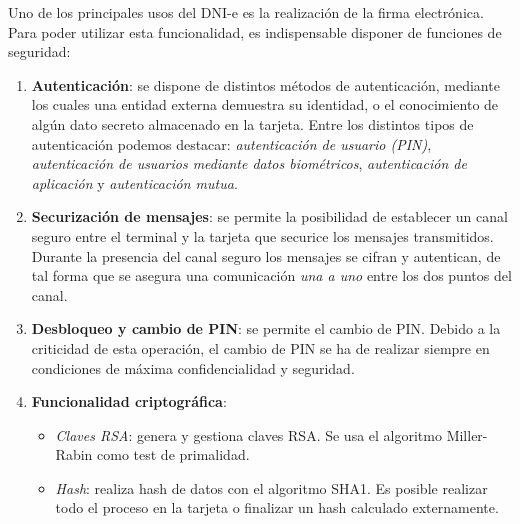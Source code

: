 \documentclass{manual}
\begin{document}




Uno de los principales usos del DNI-e es la realización de la firma electrónica. Para poder utilizar esta funcionalidad,
es indispensable disponer de funciones de seguridad:

\begin{enumerate}
	\item \textbf{Autenticación}: se dispone de distintos métodos de autenticación, mediante los cuales una entidad externa demuestra su identidad, o el conocimiento de algún dato secreto almacenado en la tarjeta. Entre los distintos tipos de autenticación podemos destacar: \textit{autenticación de usuario (PIN)}, \textit{autenticación de usuarios mediante datos biométricos}, \textit{autenticación de aplicación} y \textit{autenticación mutua}.
	
	\item \textbf{Securización de mensajes}: se permite la posibilidad de establecer un canal seguro entre el terminal y la tarjeta que securice los mensajes transmitidos. Durante la presencia del canal seguro los mensajes se cifran y autentican, de tal forma que se asegura una comunicación \textit{una a uno} entre los dos puntos del canal.	
	
	\item \textbf{Desbloqueo y cambio de PIN}: se permite el cambio de PIN. Debido a la criticidad de esta operación, el cambio de PIN se ha de realizar siempre en condiciones de máxima confidencialidad y seguridad.
	
	\item \textbf{Funcionalidad criptográfica}: 
	
	\begin{itemize}
		\item \textit{Claves RSA}: genera y gestiona claves RSA. Se usa el algoritmo Miller-Rabin como test de primalidad.
		
		\item \textit{Hash}: realiza hash de datos con el algoritmo SHA1. Es posible realizar todo el proceso en la tarjeta o finalizar un hash calculado externamente. 
		

\end{itemize}
\end{enumerate}
\end{document}
